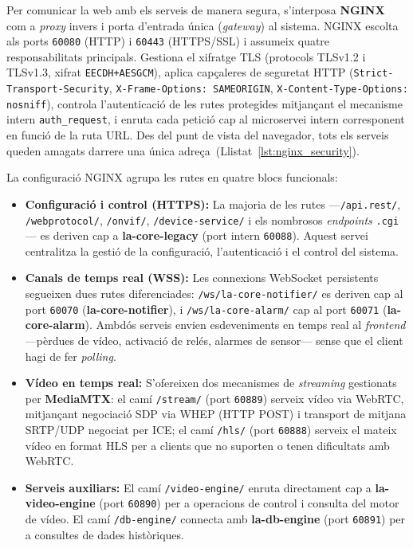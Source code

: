 Per comunicar la web amb els serveis de manera segura, s'interposa \textbf{NGINX} com a \textit{proxy} invers i porta d'entrada única (\textit{gateway}) al sistema. NGINX escolta als ports \texttt{60080} (HTTP) i \texttt{60443} (HTTPS/SSL) i assumeix quatre responsabilitats principals. Gestiona el xifratge TLS (protocols TLSv1.2 i TLSv1.3, xifrat \texttt{EECDH+AESGCM}), aplica capçaleres de seguretat HTTP (\texttt{Strict-Transport-Security}, \texttt{X-Frame-Options: SAMEORIGIN}, \texttt{X-Content-Type-Options: nosniff}), controla l'autenticació de les rutes protegides mitjançant el mecanisme intern \texttt{auth\_request}, i enruta cada petició cap al microservei intern corresponent en funció de la ruta URL. Des del punt de vista del navegador, tots els serveis queden amagats darrere una única adreça~(Llistat~\ref{lst:nginx_security}).

La configuració NGINX agrupa les rutes en quatre blocs funcionals:

\begin{itemize}
    \item \textbf{Configuració i control (HTTPS):} La majoria de les rutes —\texttt{/api.rest/}, \texttt{/webprotocol/}, \texttt{/onvif/}, \texttt{/device-service/} i els nombrosos \textit{endpoints} \texttt{.cgi}— es deriven cap a \textbf{la-core-legacy} (port intern \texttt{60088}). Aquest servei centralitza la gestió de la configuració, l'autenticació i el control del sistema.

    \item \textbf{Canals de temps real (WSS):} Les connexions WebSocket persistents segueixen dues rutes diferenciades: \texttt{/ws/la-core-notifier/} es deriven cap al port \texttt{60070} (\textbf{la-core-notifier}), i \texttt{/ws/la-core-alarm/} cap al port \texttt{60071} (\textbf{la-core-alarm}). Ambdós serveis envien esdeveniments en temps real al \textit{frontend} —pèrdues de vídeo, activació de relés, alarmes de sensor— sense que el client hagi de fer \textit{polling}.

    \item \textbf{Vídeo en temps real:} S'ofereixen dos mecanismes de \textit{streaming} gestionats per \textbf{MediaMTX}: el camí \texttt{/stream/} (port \texttt{60889}) serveix vídeo via WebRTC, mitjançant negociació SDP via WHEP (HTTP POST) i transport de mitjana SRTP/UDP negociat per ICE; el camí \texttt{/hls/} (port \texttt{60888}) serveix el mateix vídeo en format HLS per a clients que no suporten o tenen dificultats amb WebRTC. 

    \item \textbf{Serveis auxiliars:} El camí \texttt{/video-engine/} enruta directament cap a \textbf{la-video-engine} (port \texttt{60890}) per a operacions de control i consulta del motor de vídeo. El camí \texttt{/db-engine/} connecta amb \textbf{la-db-engine} (port \texttt{60891}) per a consultes de dades històriques.
\end{itemize}

